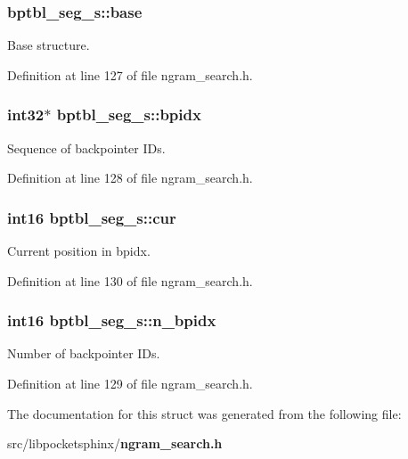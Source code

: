 \subsubsection[{base}]{ bptbl\-\_\-seg\-\_\-s\-::base}\label{structbptbl__seg__s_ac21f715b189c7e452385252bfcee47fe}


Base structure. 



Definition at line 127 of file ngram\-\_\-search.\-h.

\subsubsection[{bpidx}]{\setlength{\rightskip}{0pt plus 5cm}int32$\ast$ bptbl\-\_\-seg\-\_\-s\-::bpidx}\label{structbptbl__seg__s_a81e3d422fb2307c1a83e9490525dce7f}


Sequence of backpointer I\-Ds. 



Definition at line 128 of file ngram\-\_\-search.\-h.

\subsubsection[{cur}]{\setlength{\rightskip}{0pt plus 5cm}int16 bptbl\-\_\-seg\-\_\-s\-::cur}\label{structbptbl__seg__s_a1649196a2c03fb61b31624086ee998b5}


Current position in bpidx. 



Definition at line 130 of file ngram\-\_\-search.\-h.

\subsubsection[{n\-\_\-bpidx}]{\setlength{\rightskip}{0pt plus 5cm}int16 bptbl\-\_\-seg\-\_\-s\-::n\-\_\-bpidx}\label{structbptbl__seg__s_a8d1f0aa7dd09e2d6321a00b68ab6a051}


Number of backpointer I\-Ds. 



Definition at line 129 of file ngram\-\_\-search.\-h.



The documentation for this struct was generated from the following file\-:\begin{DoxyCompactItemize}
\item 
src/libpocketsphinx/{\bf ngram\-\_\-search.\-h}\end{DoxyCompactItemize}
